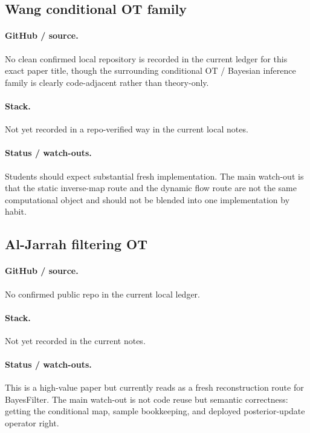 \documentclass[11pt]{report}
\begin{document}
\subsection*{Wang conditional OT family}
\paragraph{GitHub / source.}
No clean confirmed local repository is recorded in the current ledger for this
exact paper title, though the surrounding conditional OT / Bayesian inference
family is clearly code-adjacent rather than theory-only.

\paragraph{Stack.}
Not yet recorded in a repo-verified way in the current local notes.

\paragraph{Status / watch-outs.}
Students should expect substantial fresh implementation.  The main watch-out is
that the static inverse-map route and the dynamic flow route are not the same
computational object and should not be blended into one implementation by habit.

\subsection*{Al-Jarrah filtering OT}
\paragraph{GitHub / source.}
No confirmed public repo in the current local ledger.

\paragraph{Stack.}
Not yet recorded in the current notes.

\paragraph{Status / watch-outs.}
This is a high-value paper but currently reads as a fresh reconstruction route for
BayesFilter.  The main watch-out is not code reuse but semantic correctness:
getting the conditional map, sample bookkeeping, and deployed posterior-update
operator right.
\end{document}
